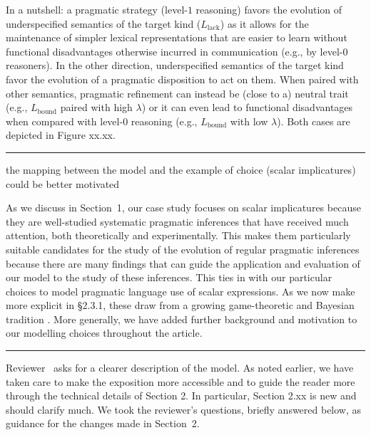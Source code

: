 \documentclass[12pt,a4paper]{article}
\newcommand{\hl}[1]{\textcolor[rgb]{.8,.33,.0}{#1}}%
\begin{document}
In a nutshell: a pragmatic strategy (level-$1$ reasoning) favors the evolution of underspecified semantics of the target kind ($L_{\text{lack}}$) as it allows for the maintenance of simpler lexical representations that are easier to learn without functional disadvantages otherwise incurred in communication (e.g., by level-$0$ reasoners). In the other direction, underspecified semantics of the target kind favor the evolution of a pragmatic disposition to act on them. When paired with other semantics, pragmatic refinement can instead be (close to a) neutral trait (e.g., $L_{\text{bound}}$ paired with high $\lambda$) or it can even lead to  functional disadvantages when compared with level-$0$ reasoning (e.g., $L_{\text{bound}}$ with low $\lambda$). Both cases are depicted in Figure \hl{xx.xx}.

%

\vspace{.75cm}
\noindent\rule{\textwidth}{1pt}

\begin{mdframed}[backgroundcolor=gray!25,linecolor=gray!25,frametitle= Reviewer \thereviewerCounter~comment \thereviewerCommentCounter \hfill ~~({\it modeling choices})]
the mapping between the model and the example of choice (scalar implicatures) could be better motivated
\end{mdframed}

As we discuss in Section~1, our case study focuses on scalar implicatures because they are well-studied systematic pragmatic inferences that have received much attention, both theoretically and experimentally. This makes them particularly suitable candidates for the study of the evolution of regular pragmatic inferences because there are many findings that can guide the application and evaluation of our model to the study of these inferences. This ties in with our particular choices to model pragmatic language use of scalar expressions. As we now make more explicit \hl{in \S 2.3.1}, these draw from a growing game-theoretic and Bayesian tradition \citep[e.g.,][]{franke:2009,FrankeJager2015:Probabilistic-p,GoodmanFrank2016:Pragmatic-Langu}. More generally, we have added further background and motivation to our modelling choices throughout the article.

%
\vspace{.75cm}
\noindent\rule{\textwidth}{1pt}
\vspace{.1cm}

Reviewer \thereviewerCounter~asks for a clearer description of the model. As noted earlier, we have taken care to make the exposition more accessible and to guide the reader more through the technical details of Section 2. \hl{In particular, Section 2.xx is new and should clarify much}. We took the reviewer's questions, briefly answered below, as guidance for the changes made in Section~2.
\end{document}
